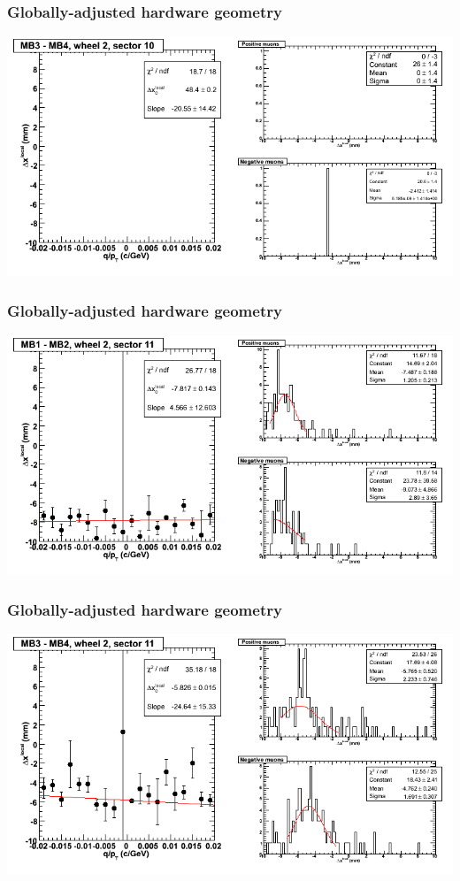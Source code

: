 \documentclass[compress]{beamer}
\begin{document}
\begin{frame}
\frametitle{Globally-adjusted hardware geometry}
\includegraphics[width=\linewidth]{NOV4_segdiffs_HW/dt13_resid_E_10_34.png}
\end{frame}

\begin{frame}
\frametitle{Globally-adjusted hardware geometry}
\includegraphics[width=\linewidth]{NOV4_segdiffs_HW/dt13_resid_E_11_12.png}
\end{frame}

\begin{frame}
\frametitle{Globally-adjusted hardware geometry}
\includegraphics[width=\linewidth]{NOV4_segdiffs_HW/dt13_resid_E_11_34.png}
\end{frame}
\end{document}
